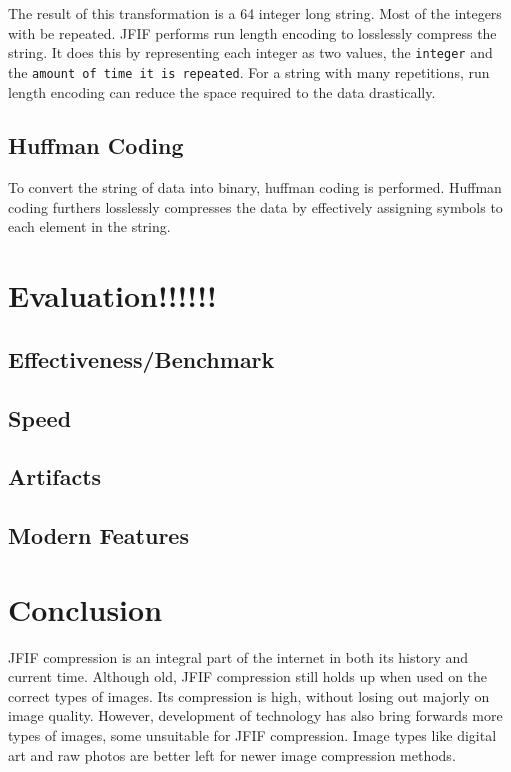 \documentclass{article}
\begin{document}
The result of this transformation is a 64 integer long string.
Most of the integers with be repeated.
JFIF performs run length encoding to losslessly compress the string.
It does this by representing each integer as two values, the \texttt{integer} and the \texttt{amount of time it is repeated}.
For a string with many repetitions, run length encoding can reduce the space required to the data drastically.

\subsection{Huffman Coding}\label{huffman}
To convert the string of data into binary, huffman coding is performed.
Huffman coding furthers losslessly compresses the data by effectively assigning symbols to each element in the string.

\section{Evaluation!!!!!!}

\subsection{Effectiveness/Benchmark}

\subsection{Speed}

\subsection{Artifacts}

\subsection{Modern Features}

\section{Conclusion}
JFIF compression is an integral part of the internet in both its history and current time.
Although old, JFIF compression still holds up when used on the correct types of images.
Its compression is high, without losing out majorly on image quality.
However, development of technology has also bring forwards more types of images, some unsuitable for JFIF compression.
Image types like digital art and raw photos are better left for newer image compression methods.

\newpage
\printbibliography
\end{document}
